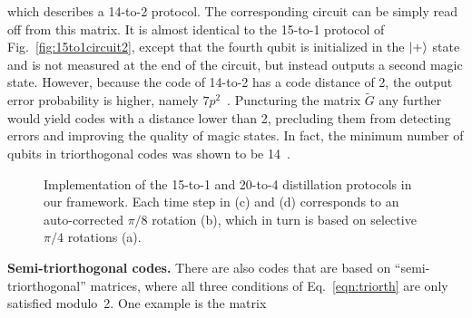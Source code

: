 \documentclass[prx,aps,letterpaper,twocolumn,allowfontchageintitle=true,accepted=2019-02-01]{quantumarticle}
\begin{document}
which describes a 14-to-2 protocol. The corresponding circuit can be simply read off from this matrix. It is almost identical to the 15-to-1 protocol of Fig.~\ref{fig:15to1circuit2}, except that the fourth qubit is initialized in the $\ket{+}$ state and is not measured at the end of the circuit, but instead outputs a second magic state. However, because the code of 14-to-2 has a code distance of 2, the output error probability is higher, namely $7p^2$~\cite{Bravyi2012}. Puncturing the matrix $\tilde{G}$ any further would yield codes with a distance lower than 2, precluding them from detecting errors and improving the quality of magic states. In fact, the minimum number of qubits in triorthogonal codes was shown to be 14~\cite{Campbell2018}.

\begin{figure}[t!]
\centering
\def\svgwidth{0.98\linewidth}

\caption{Implementation of the 15-to-1 and 20-to-4 distillation protocols in our framework. Each time step in (c) and (d) corresponds to an auto-corrected $\pi/8$ rotation (b), which in turn is based on selective $\pi/4$ rotations (a).}
\label{fig:15to1impl}
\end{figure}

\textbf{Semi-triorthogonal codes.} There are also codes that are based on ``semi-triorthogonal'' matrices, where all three conditions of Eq.~\eqref{eqn:triorth} are only satisfied modulo~2. One example is the matrix
\end{document}
